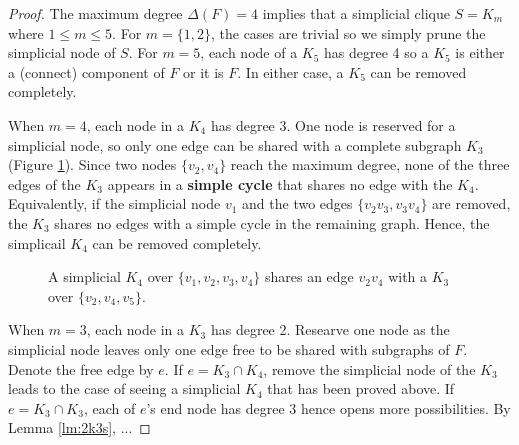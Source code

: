 \begin{proof}
The maximum degree $\Delta(F)=4$ implies that a simplicial clique $S=K_m$ where $1 \le m \le 5$. For $m=\{1,2\}$, the cases are trivial so we simply prune the simplicial node of $S$. For $m=5$, each node of a $K_5$ has degree 4 so a $K_5$ is either a (connect) component of $F$ or it is $F$. In either case, a $K_5$ can be removed completely. 

When $m=4$, each node in a $K_4$ has degree $3$. One node is reserved for a simplicial node, so only one edge can be shared with a complete subgraph $K_3$ (Figure \ref{fg:k4+k3}). Since two nodes $\{v_2,v_4\}$ reach the maximum degree, none of the three edges of the $K_3$ appears in a \textbf{simple cycle} that shares no edge with the $K_4$. Equivalently, if the simplicial node $v_1$ and the two edges $\{v_2v_3,v_3v_4\}$ are removed, the $K_3$ shares no edges with a simple cycle in the remaining graph. Hence, the simplicail $K_4$ can be removed completely. 
\begin{figure}[H]
\centering
{}
\caption{A simplicial $K_4$ over $\{v_1,v_2,v_3,v_4\}$ shares an edge $v_2v_4$ with a $K_3$ over $\{v_2,v_4,v_5\}$.}
\label{fg:k4+k3}
\end{figure}

When $m=3$, each node in a $K_3$ has degree 2. Researve one node as the simplicial node leaves only one edge free to be shared with subgraphs of $F$. Denote the free edge by $e$. If $e=K_3 \cap K_4$, remove the simplicial node of the $K_3$ leads to the case of seeing a simplicial $K_4$ that has been proved above. If $e=K_3\cap K_3$, each of $e$'s end node has degree $3$ hence opens more possibilities. By Lemma \ref{lm:2k3s}, ...




\end{proof}
